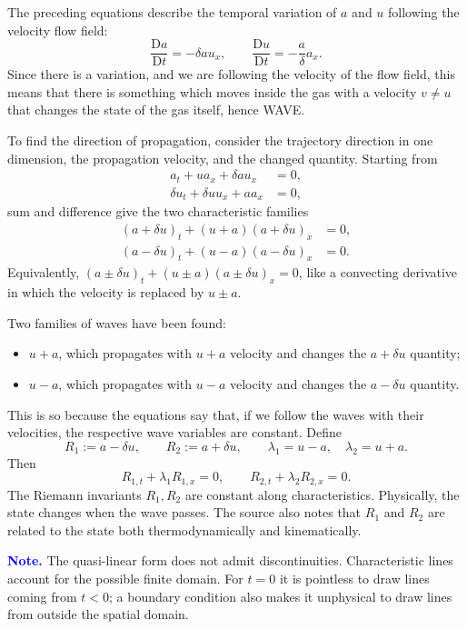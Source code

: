 \documentclass[11pt]{article}
\begin{document}
The preceding equations describe the temporal variation of \(a\) and \(u\)
following the velocity flow field:
\[
\frac{\mathrm{D}a}{\mathrm{D}t}=-\delta a u_x,
\qquad
\frac{\mathrm{D}u}{\mathrm{D}t}=-\frac{a}{\delta}a_x.
\]
Since there is a variation, and we are following the velocity of the flow
field, this means that there is something which moves inside the gas with a
velocity \(v\ne u\) that changes the state of the gas itself, hence WAVE.

To find the direction of propagation, consider the trajectory direction in
one dimension, the propagation velocity, and the changed quantity.  Starting
from
\[
\begin{aligned}
a_t+u a_x+\delta a u_x&=0,\\
\delta u_t+\delta u u_x+a a_x&=0,
\end{aligned}
\]
sum and difference give the two characteristic families
\[
\boxed{
\begin{aligned}
(a+\delta u)_t+(u+a)(a+\delta u)_x&=0,\\
(a-\delta u)_t+(u-a)(a-\delta u)_x&=0.
\end{aligned}}
\]
Equivalently, \((a\pm\delta u)_t+(u\pm a)(a\pm\delta u)_x=0\), like a
convecting derivative in which the velocity is replaced by \(u\pm a\).

Two families of waves have been found:
\begin{itemize}
  \item \(u+a\), which propagates with \(u+a\) velocity and changes the
  \(a+\delta u\) quantity;
  \item \(u-a\), which propagates with \(u-a\) velocity and changes the
  \(a-\delta u\) quantity.
\end{itemize}
This is so because the equations say that, if we follow the waves with their
velocities, the respective wave variables are constant. Define
\[
R_1:=a-\delta u,\qquad
R_2:=a+\delta u,
\qquad
\lambda_1=u-a,\quad \lambda_2=u+a.
\]
Then
\[
R_{1,t}+\lambda_1R_{1,x}=0,\qquad
R_{2,t}+\lambda_2R_{2,x}=0.
\]
The Riemann invariants \(R_1,R_2\) are constant along characteristics.
Physically, the state changes when the wave passes.
The source also notes that \(R_1\) and \(R_2\) are related to the state both
thermodynamically and kinematically.

\textcolor{blue}{\textbf{Note.}}\quad
The quasi-linear form does not admit discontinuities.  Characteristic lines
account for the possible finite domain.  For \(t=0\) it is pointless to draw
lines coming from \(t<0\); a boundary condition also makes it unphysical to
draw lines from outside the spatial domain.
\end{document}
